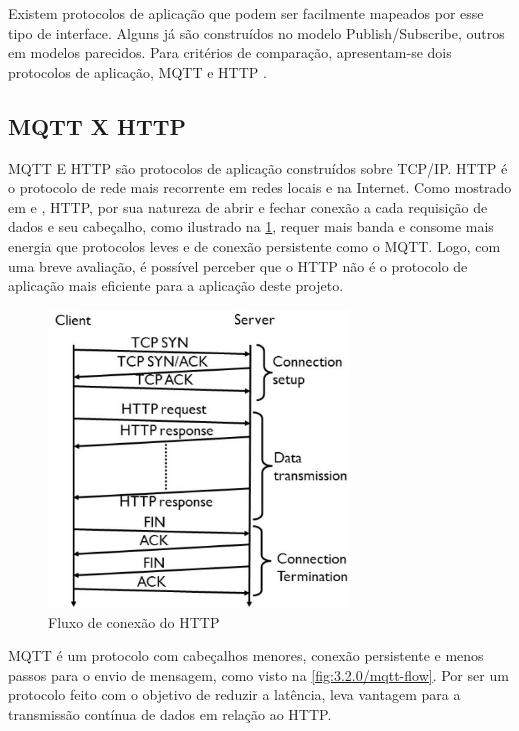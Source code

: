 Existem protocolos de aplicação que podem ser facilmente mapeados por esse tipo de interface. Alguns já são construídos no modelo Publish/Subscribe, outros em modelos parecidos. Para critérios de comparação, apresentam-se dois protocolos de aplicação, MQTT e HTTP . 

\subsection{MQTT X HTTP}
\label{subsection:mqttxhttp}

MQTT E HTTP são protocolos de aplicação construídos sobre TCP/IP.  HTTP é o protocolo de rede mais recorrente em redes locais e na Internet. Como mostrado em \cite{Tetsuya-Sasaki} e \cite{Naik}, HTTP, por sua natureza de abrir e fechar conexão a cada requisição de dados e seu cabeçalho, como ilustrado na \ref{fig:3.2.0/http-flow}, requer mais banda e consome mais energia que protocolos leves e de conexão persistente como o MQTT. Logo, com uma breve avaliação, é possível perceber que o HTTP não é o protocolo de aplicação mais eficiente para a aplicação deste projeto.

\begin{figure}[h]
\centering
\includegraphics[width=8cm]{./02_Capitulos/02_Cap3/figures/http-flow}
\caption{Fluxo de conexão do HTTP}
\label{fig:3.2.0/http-flow}
\end{figure}

MQTT é um protocolo com cabeçalhos menores, conexão persistente e menos passos para o envio de mensagem, como visto na \ref{fig:3.2.0/mqtt-flow}. Por ser um protocolo feito com o objetivo de reduzir a latência, leva vantagem para a transmissão contínua de dados  em relação ao HTTP.

